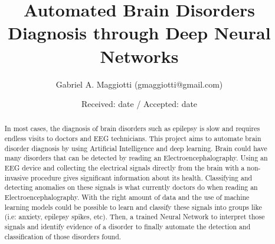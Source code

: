 \documentclass{llncs}       %
\begin{document}
\title{Automated Brain Disorders Diagnosis through Deep Neural Networks%
}


\author{Gabriel A. Maggiotti (gmaggiotti@gmail.com)
}



\date{Received: date / Accepted: date}


\maketitle


\begin{abstract}
In most cases, the diagnosis of brain disorders such as epilepsy is slow and requires endless visits to doctors and EEG technicians.  This project aims to automate brain disorder diagnosis by using  Artificial Intelligence and deep learning.  Brain could have many disorders that can be detected by reading an Electroencephalography.  Using an EEG device and collecting the electrical signals directly from the brain with a non-invasive procedure gives significant information about  its health.  Classifying and detecting anomalies on these signals is what currently doctors do when reading an Electroencephalography.  With the right amount of data and the use of machine learning models could be possible to learn and classify these signals into groups like (i.e: anxiety, epilepsy spikes, etc).  Then, a trained Neural Network to interpret those signals and identify evidence of a disorder to finally automate the detection and classification of those disorders found.
\end{abstract}


\paragraph{}\paragraph{}
\end{document}
